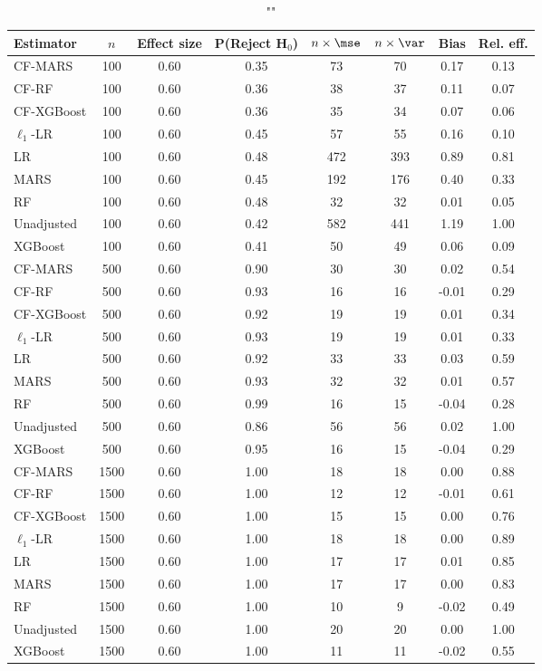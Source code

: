 \begin{table}
\centering
\caption{""}
\begin{tabular}{lccccccc}
\toprule
Estimator & $n$ & Effect size & P(Reject H$_0$) & $n\times\mse$ & $n\times \var$ & Bias & Rel. eff.\\ \midrule
CF-MARS & 100 & 0.60 & 0.35 &  73 &  70 &  0.17 & 0.13 \\ 
CF-RF & 100 & 0.60 & 0.36 &  38 &  37 &  0.11 & 0.07 \\ 
CF-XGBoost & 100 & 0.60 & 0.36 &  35 &  34 &  0.07 & 0.06 \\ 
$\ell_1$-LR & 100 & 0.60 & 0.45 &  57 &  55 &  0.16 & 0.10 \\ 
LR & 100 & 0.60 & 0.48 & 472 & 393 &  0.89 & 0.81 \\ 
MARS & 100 & 0.60 & 0.45 & 192 & 176 &  0.40 & 0.33 \\ 
RF & 100 & 0.60 & 0.48 &  32 &  32 &  0.01 & 0.05 \\ 
Unadjusted & 100 & 0.60 & 0.42 & 582 & 441 &  1.19 & 1.00 \\ 
XGBoost & 100 & 0.60 & 0.41 &  50 &  49 &  0.06 & 0.09 \\ \addlinespace 
CF-MARS & 500 & 0.60 & 0.90 &  30 &  30 &  0.02 & 0.54 \\ 
CF-RF & 500 & 0.60 & 0.93 &  16 &  16 & -0.01 & 0.29 \\ 
CF-XGBoost & 500 & 0.60 & 0.92 &  19 &  19 &  0.01 & 0.34 \\ 
$\ell_1$-LR & 500 & 0.60 & 0.93 &  19 &  19 &  0.01 & 0.33 \\ 
LR & 500 & 0.60 & 0.92 &  33 &  33 &  0.03 & 0.59 \\ 
MARS & 500 & 0.60 & 0.93 &  32 &  32 &  0.01 & 0.57 \\ 
RF & 500 & 0.60 & 0.99 &  16 &  15 & -0.04 & 0.28 \\ 
Unadjusted & 500 & 0.60 & 0.86 &  56 &  56 &  0.02 & 1.00 \\ 
XGBoost & 500 & 0.60 & 0.95 &  16 &  15 & -0.04 & 0.29 \\ \addlinespace 
CF-MARS & 1500 & 0.60 & 1.00 &  18 &  18 &  0.00 & 0.88 \\ 
CF-RF & 1500 & 0.60 & 1.00 &  12 &  12 & -0.01 & 0.61 \\ 
CF-XGBoost & 1500 & 0.60 & 1.00 &  15 &  15 &  0.00 & 0.76 \\ 
$\ell_1$-LR & 1500 & 0.60 & 1.00 &  18 &  18 &  0.00 & 0.89 \\ 
LR & 1500 & 0.60 & 1.00 &  17 &  17 &  0.01 & 0.85 \\ 
MARS & 1500 & 0.60 & 1.00 &  17 &  17 &  0.00 & 0.83 \\ 
RF & 1500 & 0.60 & 1.00 &  10 &   9 & -0.02 & 0.49 \\ 
Unadjusted & 1500 & 0.60 & 1.00 &  20 &  20 &  0.00 & 1.00 \\ 
XGBoost & 1500 & 0.60 & 1.00 &  11 &  11 & -0.02 & 0.55 \\
\bottomrule
\end{tabular}
\end{table}

